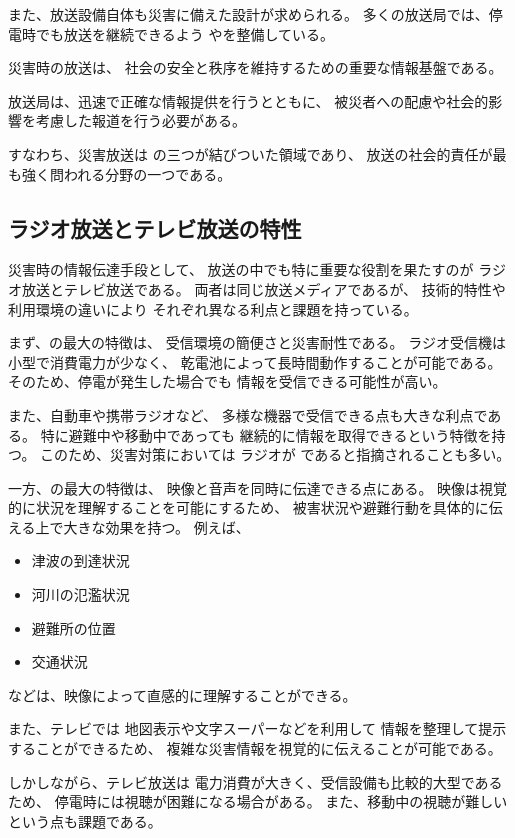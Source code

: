 また、放送設備自体も災害に備えた設計が求められる。
多くの放送局では、停電時でも放送を継続できるよう
やを整備している。


災害時の放送は、
社会の安全と秩序を維持するための重要な情報基盤である。

放送局は、迅速で正確な情報提供を行うとともに、
被災者への配慮や社会的影響を考慮した報道を行う必要がある。

すなわち、災害放送は
の三つが結びついた領域であり、
放送の社会的責任が最も強く問われる分野の一つである。

\subsection{ラジオ放送とテレビ放送の特性}

災害時の情報伝達手段として、
放送の中でも特に重要な役割を果たすのが
ラジオ放送とテレビ放送である。
両者は同じ放送メディアであるが、
技術的特性や利用環境の違いにより
それぞれ異なる利点と課題を持っている。

まず、の最大の特徴は、
受信環境の簡便さと災害耐性である。
ラジオ受信機は小型で消費電力が少なく、
乾電池によって長時間動作することが可能である。
そのため、停電が発生した場合でも
情報を受信できる可能性が高い。

また、自動車や携帯ラジオなど、
多様な機器で受信できる点も大きな利点である。
特に避難中や移動中であっても
継続的に情報を取得できるという特徴を持つ。
このため、災害対策においては
ラジオが
であると指摘されることも多い。

一方、の最大の特徴は、
映像と音声を同時に伝達できる点にある。
映像は視覚的に状況を理解することを可能にするため、
被害状況や避難行動を具体的に伝える上で大きな効果を持つ。
例えば、

\begin{itemize}
  \item 津波の到達状況
  \item 河川の氾濫状況
  \item 避難所の位置
  \item 交通状況
\end{itemize}

などは、映像によって直感的に理解することができる。

また、テレビでは
地図表示や文字スーパーなどを利用して
情報を整理して提示することができるため、
複雑な災害情報を視覚的に伝えることが可能である。

しかしながら、テレビ放送は
電力消費が大きく、受信設備も比較的大型であるため、
停電時には視聴が困難になる場合がある。
また、移動中の視聴が難しいという点も課題である。

